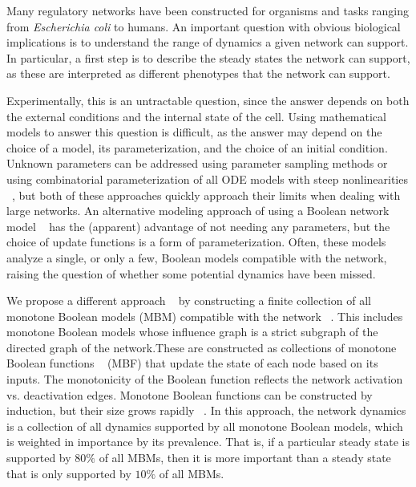 \documentclass[10pt,letterpaper]{article}
\begin{document}
Many regulatory networks have been constructed \cite{zhang_network_2008,hong_ovol2-zeb1_2015,udyavar_novel_2017,abou-jaoude_logical_2016,rios_boolean_2015,chang_systematic_2011,huang_interrogating_2017} for organisms and tasks ranging from \textit{Escherichia coli} to humans. An important question with obvious biological implications is to understand the range of dynamics a given network can support. In particular, a first step is to describe the steady states the network can support, as these are interpreted as different phenotypes that the network can support. 

Experimentally, this is an untractable question, since the answer depends on both the external conditions and the internal state of the cell. Using mathematical models to answer this question is difficult, as the answer may depend on the choice of a model, its parameterization, and the choice of an initial condition. Unknown parameters can be addressed using parameter sampling methods \cite{huang_racipe_2018} or using combinatorial parameterization of all ODE models with steep nonlinearities ~\cite{cummins_combinatorial_2016, gedeon_multi-parameter_2020}, but both of these approaches quickly approach their limits when dealing with large networks. An alternative modeling approach of using a Boolean network model ~\cite{albert_boolean_2014, stoll_maboss_2017, font-clos_topography_2018} has the (apparent) advantage of not needing any parameters, but the choice of update functions is a form of parameterization. Often, these models analyze a single, or only a few, Boolean models compatible with the network, raising the question of whether some potential dynamics have been missed.

We propose a different approach ~\cite{gedeon_network_2024} by constructing a finite collection of all monotone Boolean models (MBM) compatible with the network ~\cite{gedeon_lattice_2024}. This includes monotone Boolean models whose influence graph is a strict subgraph of the directed graph of the network.These are constructed as collections of monotone Boolean functions ~\cite{korshunov_monotone_2003} (MBF) that update the state of each node based on its inputs. The monotonicity of the Boolean function reflects the network activation vs. deactivation edges. Monotone Boolean functions can be constructed by induction, but their size grows rapidly ~\cite{fidytek_algorithms_2001, jakel_computation_2023}. In this approach, the network dynamics is a collection of all dynamics supported by all monotone Boolean models, which is weighted in importance by its prevalence. That is, if a particular steady state is supported by $80\%$ of all MBMs, then it is more important than a steady state that is only supported by $10\%$ of all MBMs.
\end{document}
